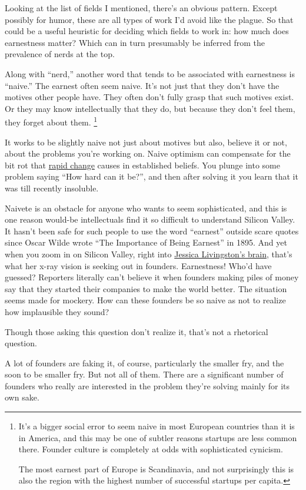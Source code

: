 Looking at the list of fields I mentioned, there's an obvious pattern.
Except possibly for humor, these are all types of work I'd avoid like
the plague. So that could be a useful heuristic for deciding which
fields to work in: how much does earnestness matter? Which can in turn
presumably be inferred from the prevalence of nerds at the top.

Along with ``nerd,'' another word that tends to be associated with
earnestness is ``naive.'' The earnest often seem naive. It's not just
that they don't have the motives other people have. They often don't
fully grasp that such motives exist. Or they may know intellectually
that they do, but because they don't feel them, they forget about them.
\footnote{It's a bigger social error to seem naive in most European
countries than it is in America, and this may be one of subtler reasons
startups are less common there. Founder culture is completely at odds
with sophisticated cynicism.

The most earnest part of Europe is Scandinavia, and not surprisingly
this is also the region with the highest number of successful startups
per capita.}

It works to be slightly naive not just about motives but also, believe
it or not, about the problems you're working on. Naive optimism can
compensate for the bit rot that \href{ecw.html}{rapid change} causes in
established beliefs. You plunge into some problem saying ``How hard can
it be?'', and then after solving it you learn that it was till recently
insoluble.

Naivete is an obstacle for anyone who wants to seem sophisticated, and
this is one reason would-be intellectuals find it so difficult to
understand Silicon Valley. It hasn't been safe for such people to use
the word ``earnest'' outside scare quotes since Oscar Wilde wrote ``The
Importance of Being Earnest'' in 1895. And yet when you zoom in on
Silicon Valley, right into \href{jessica.html}{Jessica Livingston's
brain}, that's what her x-ray vision is seeking out in founders.
Earnestness! Who'd have guessed? Reporters literally can't believe it
when founders making piles of money say that they started their
companies to make the world better. The situation seems made for
mockery. How can these founders be so naive as not to realize how
implausible they sound?

Though those asking this question don't realize it, that's not a
rhetorical question.

A lot of founders are faking it, of course, particularly the smaller
fry, and the soon to be smaller fry. But not all of them. There are a
significant number of founders who really are interested in the problem
they're solving mainly for its own sake.

